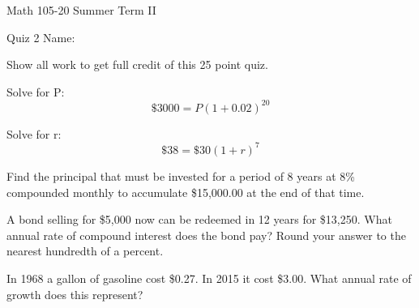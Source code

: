 \documentclass[11pt,epsfig]{article}
\begin{document}
Math 105-20 Summer Term II 

Quiz 2 \hspace{1.9in} {Name:} {\underline {\hspace{3.5in}}}
\vspace{2pc}

Show all work to get full credit of this 25 point quiz.
\vspace{2pc}

\begin{problem}{5}
Solve for P:
\begin{equation*}
\$3000=P{(1+0.02)}^{20}
\end{equation*}
\vfill
\end{problem}

\begin{problem}{5}
Solve for r:
\begin{equation*}
\$38=\$30(1+r)^7
\end{equation*}
\vfill
\end{problem}

\begin{problem}{5}
Find the principal that must be invested for a period of 8 years at 8\% compounded monthly to accumulate \$15,000.00 at the end of that time.

\vfill
\end{problem}

\newpage

\begin{problem}{5}
A bond selling for \$5,000 now can be redeemed in 12 years for \$13,250. What annual rate of compound interest does the bond pay? Round your answer to the nearest hundredth of a percent. 

\vfill
\end{problem}

\begin{problem}{5}
In 1968 a gallon of gasoline cost \$0.27. In 2015 it cost \$3.00. What annual rate of growth does this represent? 
\vfill
\end{problem}

\showpoints
\end{document}
